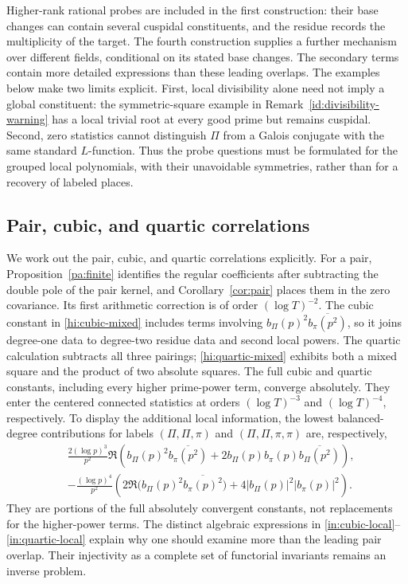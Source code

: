 \documentclass[11pt,reqno]{amsart}
\numberwithin{equation}{section}
\theoremstyle{definition}
\theoremstyle{remark}
\begin{document}
Higher-rank rational probes are included in the first construction: their base changes can contain several cuspidal constituents, and the residue records the multiplicity of the target. The fourth construction supplies a further mechanism over different fields, conditional on its stated base changes. The secondary terms contain more detailed expressions than these leading overlaps. The examples below make two limits explicit. First, local divisibility alone need not imply a global constituent: the symmetric-square example in Remark~\ref{id:divisibility-warning} has a local trivial root at every good prime but remains cuspidal. Second, zero statistics cannot distinguish $\Pi$ from a Galois conjugate with the same standard $L$-function. Thus the probe questions must be formulated for the grouped local polynomials, with their unavoidable symmetries, rather than for a recovery of labeled places.

\subsection{Pair, cubic, and quartic correlations}
We work out the pair, cubic, and quartic correlations explicitly. For a pair, Proposition~\ref{pa:finite} identifies the regular coefficients after subtracting the double pole of the pair kernel, and Corollary~\ref{cor:pair} places them in the zero covariance. Its first arithmetic correction is of order $(\log T)^{-2}$. The cubic constant in \eqref{hi:cubic-mixed} includes terms involving $b_\Pi(p)^2\overline{b_\pi(p^2)}$, so it joins degree-one data to degree-two residue data and second local powers. The quartic calculation subtracts all three pairings; \eqref{hi:quartic-mixed} exhibits both a mixed square and the product of two absolute squares. The full cubic and quartic constants, including every higher prime-power term, converge absolutely. They enter the centered connected statistics at orders $(\log T)^{-3}$ and $(\log T)^{-4}$, respectively. To display the additional local information, the lowest balanced-degree contributions for labels $(\Pi,\Pi,\pi)$ and $(\Pi,\Pi,\pi,\pi)$ are, respectively,
\begin{align}
&\frac{2(\log p)^3}{p^2}\Re\left(b_\Pi(p)^2\overline{b_\pi(p^2)}
+2b_\Pi(p)b_\pi(p)\overline{b_\Pi(p^2)}\right),\label{in:cubic-local}\\
&-\frac{(\log p)^4}{p^2}\left(2\Re\bigl(b_\Pi(p)^2\overline{b_\pi(p)^2}\bigr)
+4|b_\Pi(p)|^2|b_\pi(p)|^2\right).\label{in:quartic-local}
\end{align}
They are portions of the full absolutely convergent constants, not replacements for the higher-power terms. The distinct algebraic expressions in \eqref{in:cubic-local}--\eqref{in:quartic-local} explain why one should examine more than the leading pair overlap. Their injectivity as a complete set of functorial invariants remains an inverse problem.
\end{document}
